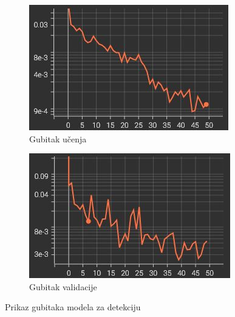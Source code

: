 \documentclass[times, utf8, diplomski]{fer}
\begin{document}
\begin{figure}[H]
     \centering
     \begin{subfigure}[b]{0.4\textwidth}
         \centering
         \includegraphics[width=\textwidth]{figures/results/detector_train.jpg}
         \caption{Gubitak učenja}
     \end{subfigure}
     \hspace{0.5cm}
     \begin{subfigure}[b]{0.4\textwidth}
         \centering
         \includegraphics[width=\textwidth]{figures/results/detector_val.jpg}
         \caption{Gubitak validacije}
     \end{subfigure}
    \caption{Prikaz gubitaka modela za detekciju}
    \label{fig:loss_detector}
\end{figure}
\end{document}
